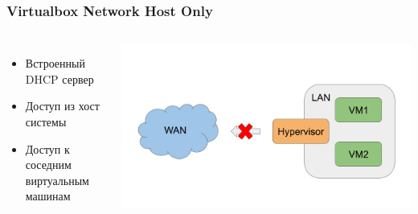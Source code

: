 \begin{frame}
\frametitle{Virtualbox Network Host Only}
	\begin{columns}
        \begin{itemize}
            \item Встроенный DHCP сервер
            \item Доступ из хост системы
            \item Доступ к соседним виртуальным машинам
        \end{itemize}
    \includegraphics[height=0.4\textheight]{../../slides/vbox/Virtualbox network HostOnly.png}
	\end{columns}
\end{frame}